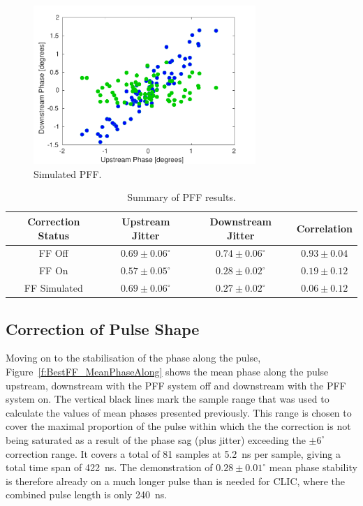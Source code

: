 \begin{figure}
  \centering
  \includegraphics[width=0.75\textwidth]{Figures/feedforward/BestFF_Simulated}
  \caption{Simulated PFF.}
  \label{f:BestFF_Simulated}
\end{figure}


\begin{table}
  \begin{center}
    \begin{tabular}{| c | c | c | c |}
	   \hline
       Correction Status & Upstream Jitter & Downstream Jitter & Correlation \\ \hline
       FF Off & \(0.69\pm0.06^\circ\) & \(0.74\pm0.06^\circ\) & \(0.93\pm0.04\) \\
	   FF On & \(0.57\pm0.05^\circ\) & \(0.28\pm0.02^\circ\) & \(0.19\pm0.12\) \\
	   FF Simulated & \(0.69\pm0.06^\circ\) & \(0.27\pm0.02^\circ\) & \(0.06\pm0.12\) \\ \hline
    \end{tabular}
    \caption{Summary of PFF results.}
  	\label{t:BestFF}
  \end{center}
\end{table}

\subsection{Correction of Pulse Shape}
\label{ss:bestPulseShape}

Moving on to the stabilisation of the phase along the pulse, 
Figure~\ref{f:BestFF_MeanPhaseAlong} shows the mean phase along the pulse upstream, 
downstream with the PFF system off and downstream with the PFF system on. The vertical 
black lines mark the sample range that was used to calculate the values of mean phases  
presented previously. This range is chosen to cover the maximal proportion of the pulse 
within which the the correction is not being saturated as a result of the phase sag 
(plus jitter) exceeding the \(\pm6^\circ\) correction range. It covers a total of 81 
samples at 5.2~ns per sample, giving a total time span of 422~ns. The demonstration of 
\(0.28\pm0.01^\circ\) mean phase stability is therefore already on a much longer pulse 
than is needed for CLIC, where the combined pulse length is only 240~ns. 




